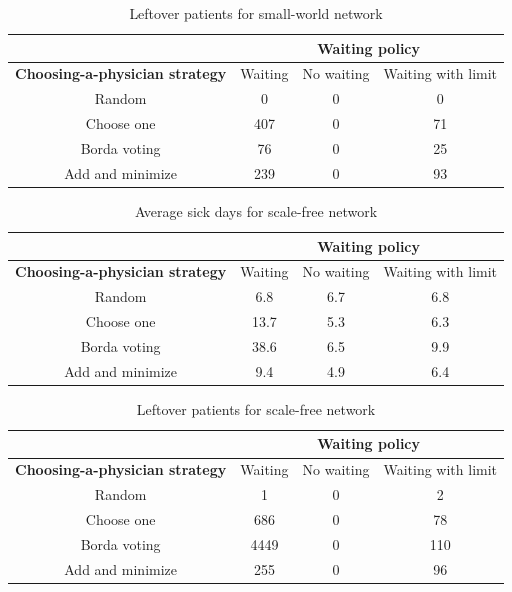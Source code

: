 \begin{table}[!t]
\centering
\caption{Leftover patients for small-world network}

\begin{tabular}{|c|c|c|c|}
\hline
& \multicolumn{3}{c|}{\textbf{Waiting policy}}\\ \hline
\textbf{Choosing-a-physician strategy}
& Waiting & No waiting & Waiting with limit\\ \hline
Random& 0 & 0 & 0\\ \hline
Choose one& 407 & 0 & 71\\ \hline
Borda voting& 76 & 0 & 25\\ \hline
Add and minimize & 239 & 0 & 93\\ \hline
\end{tabular}
\label{ch3:tpsmall}
\end{table}


\begin{table}[!t]
\centering
\caption{Average sick days for scale-free network}

\begin{tabular}{|c|c|c|c|}
\hline
& \multicolumn{3}{c|}{\textbf{Waiting policy}}\\ \hline
\textbf{Choosing-a-physician strategy}
& Waiting & No waiting & Waiting with limit\\ \hline
Random& 6.8 & 6.7 &6.8 \\ \hline
Choose one& 13.7 & 5.3 & 6.3\\ \hline
Borda voting& 38.6 & 6.5 & 9.9\\ \hline
Add and minimize & 9.4 & 4.9 & 6.4 \\ \hline
\end{tabular}
\label{ch3:tdcale}
\end{table}

\begin{table}[!t]
\centering
\caption{Leftover patients for scale-free network}

\begin{tabular}{|c|c|c|c|}
\hline
& \multicolumn{3}{c|}{\textbf{Waiting policy}}\\ \hline
\textbf{Choosing-a-physician strategy}
& Waiting & No waiting & Waiting with limit\\ \hline
Random& 1 & 0 & 2\\ \hline
Choose one& 686 & 0 & 78\\ \hline
Borda voting& 4449 & 0 & 110\\ \hline
Add and minimize & 255 & 0 & 96\\ \hline
\end{tabular}
\label{ch3:tpscale}
\end{table}

